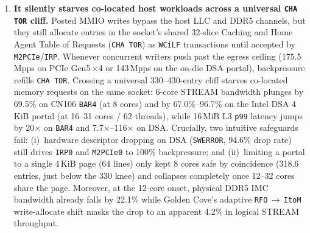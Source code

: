 \begin{enumerate}
  \item \textbf{It silently starves co-located host workloads across a universal \texttt{CHA TOR} cliff.} Posted MMIO writes bypass the host LLC and DDR5 channels, but they still allocate entries in the socket's shared 32-slice Caching and Home Agent Table of Requests (\texttt{CHA TOR}) as \texttt{WCiLF} transactions until accepted by \texttt{M2PCIe}/\texttt{IRP}. Whenever concurrent writers push past the egress ceiling (175.5\,Mpps on PCIe Gen5\,$\times$4 or 143\,Mpps on the on-die DSA portal), backpressure refills \texttt{CHA TOR}. Crossing a universal 330--430-entry cliff starves co-located memory requests on the same socket: 6-core STREAM bandwidth plunges by 69.5\% on CN106 \texttt{BAR4} (at 8 cores) and by 67.0\%--96.7\% on the Intel DSA 4\,KiB portal (at 16--31 cores / 62 threads), while 16\,MiB L3 \texttt{p99} latency jumps by 20$\times$ on \texttt{BAR4} and 7.7$\times$--116$\times$ on DSA. Crucially, two intuitive safeguards fail: (i)~hardware descriptor dropping on DSA (\texttt{SWERROR}, 94.6\% drop rate) still drives \texttt{IRP0} and \texttt{M2PCIe0} to 100\% backpressure; and (ii)~limiting a portal to a single 4\,KiB page (64 lines) only kept 8 cores safe by coincidence (318.6 entries, just below the 330 knee) and collapses completely once 12--32 cores share the page. Moreover, at the 12-core onset, physical DDR5 IMC bandwidth already falls by 22.1\% while Golden Cove's adaptive \texttt{RFO}\,$\to$\,\texttt{ItoM} write-allocate shift masks the drop to an apparent 4.2\% in logical STREAM throughput.


\end{enumerate}
